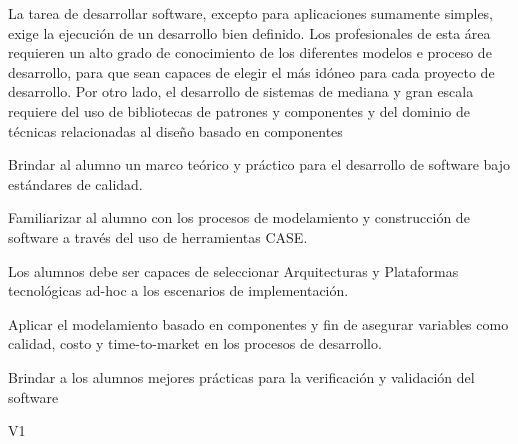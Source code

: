 \begin{syllabus}


\begin{justification}
	La tarea de desarrollar software, excepto para aplicaciones sumamente simples, exige la ejecución de un desarrollo bien definido. Los profesionales de esta área requieren un alto grado de conocimiento de los diferentes modelos e proceso de desarrollo, para que sean capaces de elegir el más idóneo para cada proyecto de desarrollo. Por otro lado, el desarrollo de sistemas de mediana y gran escala requiere del uso de bibliotecas de patrones y componentes y del dominio de técnicas relacionadas al diseño basado en componentes
	\end{justification}
	
	\begin{goals}
	\item Brindar al alumno un marco teórico y práctico para el desarrollo de software bajo estándares de calidad.
	\item Familiarizar al alumno con los procesos de modelamiento y construcción de software a través del uso de herramientas CASE.
	\item Los alumnos debe ser capaces de seleccionar Arquitecturas y Plataformas tecnológicas ad-hoc a los escenarios de implementación.
	\item Aplicar el modelamiento basado en componentes y fin de asegurar variables como calidad, costo y time-to-market en los procesos de desarrollo.
	\item Brindar a los alumnos mejores prácticas para la verificación y validación del software
	\end{goals}
	
	\begin{outcomes}{V1}
		\item {}
		\item {}
		\item {}
		\item {}
		\item {}
	\end{outcomes}
	

\end{syllabus}
